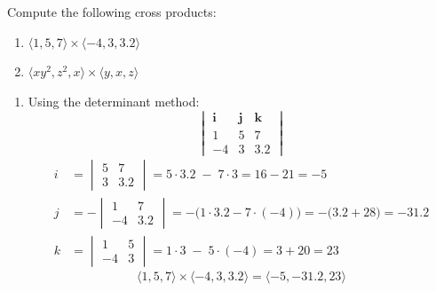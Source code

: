 \exampleline
\begin{example}
Compute the following cross products:
\begin{enumerate}
   \item $\langle 1, 5, 7\rangle \times \langle -4, 3, 3.2\rangle$
   \item $\langle xy^2, z^2, x\rangle \times \langle y, x, z\rangle$
\end{enumerate}

\begin{solution}
\begin{enumerate}
   \item Using the determinant method:
   \[
   \begin{vmatrix}
   \mathbf{i} & \mathbf{j} & \mathbf{k} \\
   1 & 5 & 7 \\
   -4 & 3 & 3.2
   \end{vmatrix}
   \]
   \[
   \begin{aligned}
   i &= \begin{vmatrix} 5 & 7 \\ 3 & 3.2 \end{vmatrix} 
       = 5 \cdot 3.2 \;-\; 7 \cdot 3 
       = 16 - 21 
       = -5 \\[1ex]
   j &= -\begin{vmatrix} 1 & 7 \\ -4 & 3.2 \end{vmatrix} 
       = -\bigl(1 \cdot 3.2 - 7 \cdot (-4)\bigr) 
       = -\bigl(3.2 + 28\bigr) 
       = -31.2 \\[1ex]
   k &= \begin{vmatrix} 1 & 5 \\ -4 & 3 \end{vmatrix} 
       = 1 \cdot 3 \;-\; 5 \cdot (-4) 
       = 3 + 20 
       = 23
   \end{aligned}
   \]
   \[
   \langle 1, 5, 7\rangle \times \langle -4, 3, 3.2\rangle 
   = \langle -5, -31.2, 23\rangle
   \]


\end{enumerate}
\end{solution}
\end{example}
